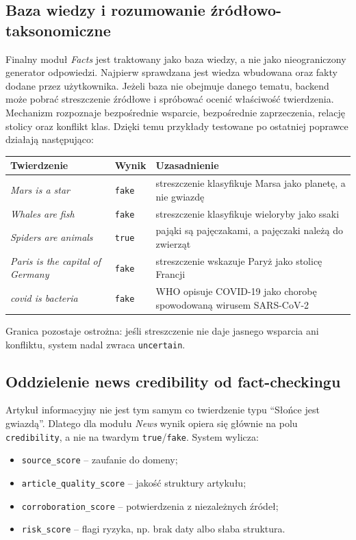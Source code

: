 \documentclass[12pt,a4paper]{article}
\begin{document}
\subsection{Baza wiedzy i rozumowanie źródłowo-taksonomiczne}
Finalny moduł \textit{Facts} jest traktowany jako baza wiedzy, a nie jako nieograniczony generator odpowiedzi.
Najpierw sprawdzana jest wiedza wbudowana oraz fakty dodane przez użytkownika.
Jeżeli baza nie obejmuje danego tematu, backend może pobrać streszczenie źródłowe i spróbować ocenić właściwość twierdzenia.
Mechanizm rozpoznaje bezpośrednie wsparcie, bezpośrednie zaprzeczenia, relację stolicy oraz konflikt klas.
Dzięki temu przykłady testowane po ostatniej poprawce działają następująco:
\begin{center}
\footnotesize
\begin{tabularx}{0.94\textwidth}{p{}p{}Y}
\toprule
Twierdzenie & Wynik & Uzasadnienie \\
\midrule
\textit{Mars is a star} & \texttt{fake} & streszczenie klasyfikuje Marsa jako planetę, a nie gwiazdę \\
\textit{Whales are fish} & \texttt{fake} & streszczenie klasyfikuje wieloryby jako ssaki \\
\textit{Spiders are animals} & \texttt{true} & pająki są pajęczakami, a pajęczaki należą do zwierząt \\
\textit{Paris is the capital of Germany} & \texttt{fake} & streszczenie wskazuje Paryż jako stolicę Francji \\
\textit{covid is bacteria} & \texttt{fake} & WHO opisuje COVID-19 jako chorobę spowodowaną wirusem SARS-CoV-2 \\
\bottomrule
\end{tabularx}
\end{center}

Granica pozostaje ostrożna: jeśli streszczenie nie daje jasnego wsparcia ani konfliktu, system nadal zwraca \texttt{uncertain}.

\subsection{Oddzielenie news credibility od fact-checkingu}
Artykuł informacyjny nie jest tym samym co twierdzenie typu ``Słońce jest gwiazdą''.
Dlatego dla modułu \textit{News} wynik opiera się głównie na polu \texttt{credibility}, a nie na twardym \texttt{true}/\texttt{fake}.
System wylicza:
\begin{itemize}
  \item \texttt{source\_score} -- zaufanie do domeny;
  \item \texttt{article\_quality\_score} -- jakość struktury artykułu;
  \item \texttt{corroboration\_score} -- potwierdzenia z niezależnych źródeł;
  \item \texttt{risk\_score} -- flagi ryzyka, np. brak daty albo słaba struktura.
\end{itemize}
\end{document}

